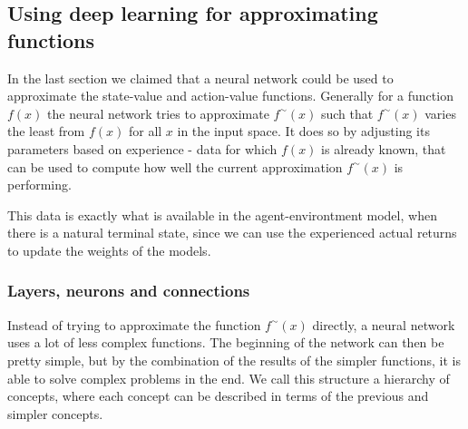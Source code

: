 \documentclass[11pt]{article}
\begin{document}
\maketitle

\subsection{Using deep learning for approximating functions}\label{sec:deep_learning}

In the last section we claimed that a neural network could be used to approximate the
state-value and action-value functions.
Generally for a function $f(x)$ the neural network tries to approximate $f^\sim(x)$
such that $f^\sim(x)$ varies the least from $f(x)$ for all $x$ in the input space\cite{DeepLearningBook}.
It does so by adjusting its parameters based on experience - data for which $f(x)$ is already known,
that can be used to compute how well the current approximation $f^\sim(x)$ is performing.

This data is exactly what is available in the agent-environtment model, when there is a natural terminal state,
since we can use the experienced actual returns to update the weights of the models.

\subsubsection{Layers, neurons and connections}

Instead of trying to approximate the function $f^\sim(x)$ directly,
a neural network uses a lot of less complex functions.
The beginning of the network can then be pretty simple, but by the combination of the results of
the simpler functions, it is able to solve complex problems in the end.
We call this structure a hierarchy of concepts, where each concept can be described in terms
of the previous and simpler concepts\cite{DeepLearningBook}.
\end{document}
